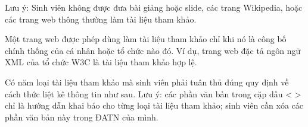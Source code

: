 \documentclass[../DoAn.tex]{subfiles}
\begin{document}
Lưu ý: Sinh viên không được đưa bài giảng hoặc slide, các trang Wikipedia, hoặc các trang web thông thường làm tài liệu tham khảo.

Một trang web được phép dùng làm tài liệu tham khảo chỉ khi nó là công bố chính thống của cá nhân hoặc tổ chức nào đó. Ví dụ, trang web đặc tả ngôn ngữ XML của tổ chức W3C là tài liệu tham khảo hợp lệ.

Có năm loại tài liệu tham khảo mà sinh viên phải tuân thủ đúng quy định về cách thức liệt kê thông tin như sau. Lưu ý: các phần văn bản trong cặp dấu < > chỉ là hướng dẫn khai báo cho từng loại tài liệu tham khảo; sinh viên cần xóa các phần văn bản này trong ĐATN của mình.
\end{document}

